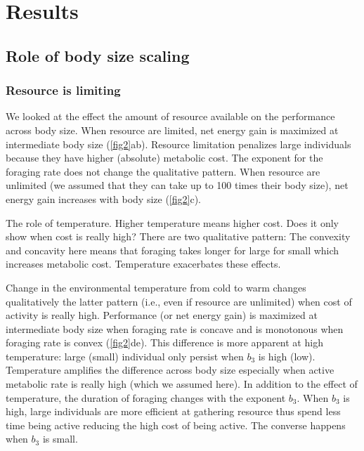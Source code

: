 \section*{Results}
\subsection*{Role of body size scaling}
\subsubsection*{Resource is limiting}
We looked at the effect the amount of resource available on the performance across body size.
  When resource are limited,  net energy gain is maximized at intermediate body size (\cref{fig2}ab).
 Resource limitation penalizes large individuals because they have higher (absolute) metabolic cost. 
 The exponent for the foraging rate does not change the qualitative pattern.
 When resource are unlimited (we assumed that they can take up to 100 times their body size), net energy gain increases with body size (\cref{fig2}c).

The role of temperature.
Higher temperature means higher cost. Does it only show when cost is really high?
There are two qualitative pattern:
The convexity and concavity here means that foraging takes longer for large for small which increases metabolic cost.
Temperature exacerbates these effects.

Change in the environmental temperature from cold to warm changes qualitatively the latter pattern (i.e., even if resource are unlimited) when cost of activity is really high. 
Performance (or net energy gain) is maximized at intermediate body size when foraging rate is concave and is monotonous when foraging rate is convex (\cref{fig2}de).
This difference is more apparent at high temperature: large (small) individual only persist when $b_3$ is high (low).  
Temperature amplifies the difference across body size especially when active metabolic rate is really high (which we assumed here).
In addition to the effect of temperature, the duration of foraging changes with  the exponent $b_3$.
When $b_3$ is high, large individuals are more efficient at gathering resource thus spend less time being active reducing the high cost of being active.
The converse happens when $b_3$ is small.
